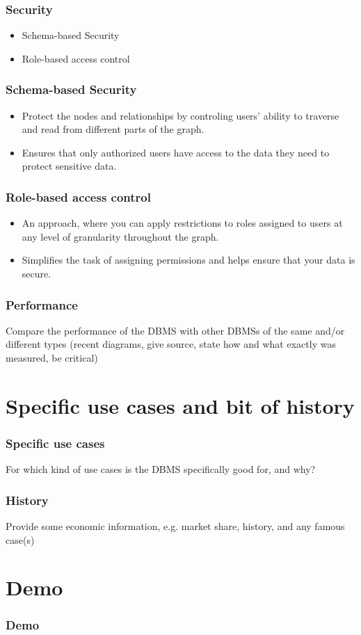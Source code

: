 \documentclass[aspectratio=169]{beamer}
\begin{document}
\begin{frame}
    \frametitle{Security}

    \begin{itemize}
        \item Schema-based Security 
        \item Role-based access control 
    \end{itemize}
\end{frame}

\begin{frame}
    \frametitle{Schema-based Security}
    \begin{itemize}
        \item Protect the nodes and relationships by controling users' ability to traverse and read from different parts of the graph.
        \item Ensures that only authorized users have access to the data they need to protect sensitive data.
    \end{itemize}
\end{frame}

\begin{frame}
    \frametitle{Role-based access control}
    \begin{itemize}
        \item An approach, where you can apply restrictions to roles assigned to users at any level of granularity throughout the graph.
        \item Simplifies the task of assigning permissions and helps ensure that your data is secure.
    \end{itemize}
\end{frame}

\begin{frame}
    \frametitle{Performance}

    Compare the performance of the DBMS with other DBMSs of the same and/or different
    types (recent diagrams, give source, state how and what exactly was measured, be critical)
\end{frame}

\section{Specific use cases and bit of history}

\begin{frame}
    \frametitle{Specific use cases}
    For which kind of use cases is the DBMS specifically good for, and why?
\end{frame}

\begin{frame}
    \frametitle{History}
    Provide some economic information, e.g. market share, history, and any famous case(s)
\end{frame}

\section{Demo}

\begin{frame}
    \frametitle{Demo}
\end{frame}
\end{document}
